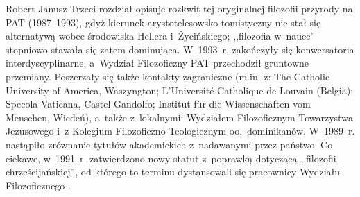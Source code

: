 \begin{newrevplenv}{Robert Janusz}
Trzeci rozdział opisuje rozkwit tej oryginalnej filozofii przyrody na PAT (1987--1993), gdyż kierunek arystotelesowsko-tomistyczny nie stał się alternatywą wobec środowiska Hellera i~Życińskiego; ,,filozofia w~nauce'' stopniowo stawała się zatem dominująca. W~1993~r. zakończyły się konwersatoria interdyscyplinarne, a~Wydział Filozoficzny PAT przechodził gruntowne przemiany. Poszerzały się także kontakty zagraniczne (m.in. z: The Catholic University of America, Waszyngton; L'Université Catholique de Louvain (Belgia); Specola Vaticana, Castel Gandolfo; Institut für die Wissenschaften vom Menschen, Wiedeń), a~także z~lokalnymi: Wydziałem Filozoficznym Towarzystwa Jezusowego i~z Kolegium Filozoficzno-Teologicznym \mbox{oo.~dominikanów}. W~1989~r. nastąpiło zrównanie tytułów akademickich z~nadawanymi przez państwo. Co ciekawe, w~1991~r. zatwierdzono nowy statut z~poprawką dotyczącą ,,filozofii chrześcijańskiej'', od którego to terminu dystansowali się pracownicy Wydziału Filozoficznego
\parencite[][s.~168–169]{trombik_koncepcje_2021}. %

\end{newrevplenv}
